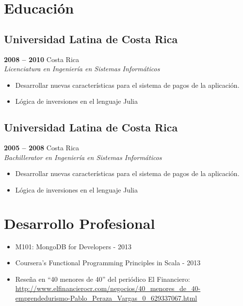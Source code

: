 \documentclass[a4paper,10pt]{article}
\begin{document}
\section*{Educación}
\subsection*{Universidad Latina de Costa Rica}
\textbf{2008 -- 2010} \hfill  Costa Rica \\
\emph{Licenciatura en Ingeniería en Sistemas Informáticos}
\begin{itemize}
    \item Desarrollar nuevas características para el sistema de pagos de la aplicación.
    \item Lógica de inversiones en el lenguaje Julia
\end{itemize}

\subsection*{Universidad Latina de Costa Rica}
\textbf{2005 -- 2008} \hfill  Costa Rica \\
\emph{Bachillerator en Ingeniería en Sistemas Informáticos}
\begin{itemize}
    \item Desarrollar nuevas características para el sistema de pagos de la aplicación.
    \item Lógica de inversiones en el lenguaje Julia
\end{itemize}

\section*{Desarrollo Profesional}
\begin{itemize}
    \item M101: MongoDB for Developers - 2013
    \item Coursera’s Functional Programming Principles in Scala - 2013
    \item Reseña en ``40 menores de 40'' del periódico El Financiero: 
    \url{http://www.elfinancierocr.com/negocios/40_menores_de_40-emprendedurismo-Pablo_Peraza_Vargas_0_629337067.html}
\end{itemize}
\end{document}
